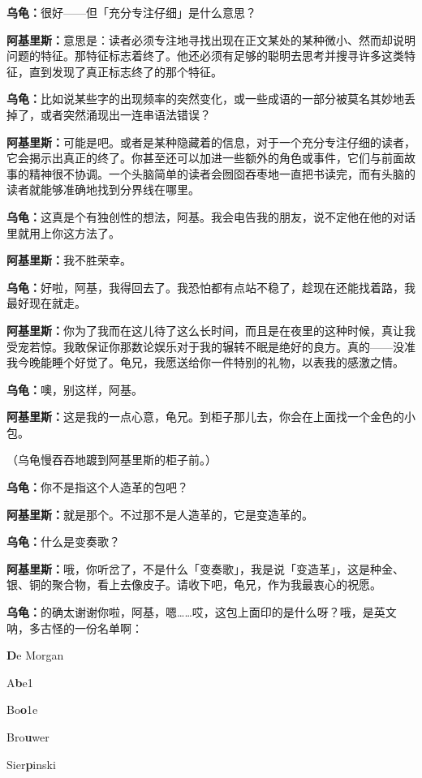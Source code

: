 \documentclass[
  12pt,
  twoside,
  openright,
  oldfontcommands,
]{memoir}
\newcommand{\heititext}[1]{{\heifamily\bfseries #1}}
\newcommand{\dialogname}[1]{{\heifamily\bfseries #1}}
\begin{document}
\dialogname{乌龟：}很好------但「充分专注仔细」是什么意思？

\dialogname{阿基里斯：}意思是：读者必须专注地寻找出现在正文某处的某种微小、然而却说明问题的特征。那特征标志着终了。他还必须有足够的聪明去思考并搜寻许多这类特征，直到发现了真正标志终了的那个特征。

\dialogname{乌龟：}比如说某些字的出现频率的突然变化，或一些成语的一部分被莫名其妙地丢掉了，或者突然涌现出一连串语法错误？

\dialogname{阿基里斯：}可能是吧。或者是某种隐藏着的信息，对于一个充分专注仔细的读者，它会揭示出真正的终了。你甚至还可以加进一些额外的角色或事件，它们与前面故事的精神很不协调。一个头脑简单的读者会囫囵吞枣地一直把书读完，而有头脑的读者就能够准确地找到分界线在哪里。

\dialogname{乌龟：}这真是个有独创性的想法，阿基。我会电告我的朋友，说不定他在他的对话里就用上你这方法了。

\dialogname{阿基里斯：}我不胜荣幸。

\dialogname{乌龟：}好啦，阿基，我得回去了。我恐怕都有点站不稳了，趁现在还能找着路，我最好现在就走。

\dialogname{阿基里斯：}你为了我而在这儿待了这么长时间，而且是在夜里的这种时候，真让我受宠若惊。我敢保证你那数论娱乐对于我的辗转不眠是绝好的良方。真的------没准我今晚能睡个好觉了。龟兄，我愿送给你一件特别的礼物，以表我的感激之情。

\dialogname{乌龟：}噢，别这样，阿基。

\dialogname{阿基里斯：}这是我的一点心意，龟兄。到柜子那儿去，你会在上面找一个金色的小包。

（乌龟慢吞吞地踱到阿基里斯的柜子前。）

\dialogname{乌龟：}你不是指这个人造革的包吧？

\dialogname{阿基里斯：}就是那个。不过那不是人造革的，它是变造革的。

\dialogname{乌龟：}什么是变奏歌？

\dialogname{阿基里斯：}哦，你听岔了，不是什么「变奏歌」，我是说「变造革」，这是种金、银、铜的聚合物，看上去像皮子。请收下吧，龟兄，作为我最衷心的祝愿。

\dialogname{乌龟：}的确太谢谢你啦，阿基，嗯\ldots\ldots 哎，这包上面印的是什么呀？哦，是英文呐，多古怪的一份名单啊：

\heititext{D}e Morgan

A\heititext{b}e1

Bo\heititext{o}1e

Bro\heititext{u}wer

Sier\heititext{p}inski
\end{document}
